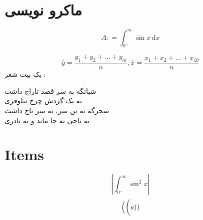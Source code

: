 \documentclass{book}
\newcommand{\dd}{\, \mathrm{d}}
\newcommand{\mian}[2]{\frac{#1_1 + #1_2 + \dots + #1_{#2}}{n}}
\begin{document}
\chapter{ماکرو نویسی}
\[
A \colon = \int_{0^{-}}^{\infty} \sin x \dd x
\]

\[
\bar{y} = \mian{y}{m}, \bar{x} = \mian{x}{10}
\]
 	یک بیت شعر :
\begin{multicols}{2}
شبانگه به سر قصد تاراج داشت \\ به یک گردش چرخ نیلوفری 
	\\
سحرگه نه تن سر، نه سر تاج داشت \\ نه تاجی به جا ماند و نه نادری
\end{multicols}

\chapter{Items}
\Time
\[
\left\lvert \int_{0^-}^{\infty} \sin^2 x \right\rvert
\]
\[
\Big( \bigg( a)\small)
\]
\end{document}
